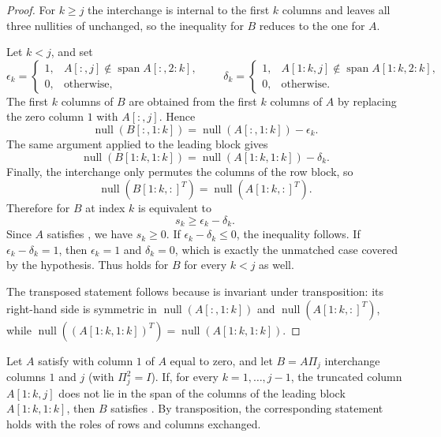 \documentclass[10pt,twoside]{siamart1116}
\DeclareMathOperator{\nl}{null}
\numberwithin{theorem}{section}
\begin{document}
\begin{proof}
  For $k \ge j$ the interchange is internal to the first $k$ columns and leaves all three nullities of  unchanged, so the inequality for $B$ reduces to the one for $A$.

  Let $k < j$, and set
  \[
    \epsilon_k =
    \begin{cases}
      1, & A[:,j] \notin \operatorname{span} A[:,2:k],\\
      0, & \text{otherwise},
    \end{cases}
    \qquad
    \delta_k =
    \begin{cases}
      1, & A[1:k,j] \notin \operatorname{span} A[1:k,2:k],\\
      0, & \text{otherwise}.
    \end{cases}
  \]
  The first $k$ columns of $B$ are obtained from the first $k$ columns of $A$ by replacing the zero column $1$ with $A[:,j]$. Hence
  \[
    \nl(B[:,1:k]) = \nl(A[:,1:k]) - \epsilon_k.
  \]
  The same argument applied to the leading block gives
  \[
    \nl(B[1:k,1:k]) = \nl(A[1:k,1:k]) - \delta_k.
  \]
  Finally, the interchange only permutes the columns of the row block, so
  \[
    \nl({B[1:k,:]}^T) = \nl({A[1:k,:]}^T).
  \]
  Therefore  for $B$ at index $k$ is equivalent to
  \[
    s_k \ge \epsilon_k - \delta_k.
  \]
  Since $A$ satisfies , we have $s_k \ge 0$. If $\epsilon_k - \delta_k \le 0$, the inequality follows. If $\epsilon_k - \delta_k = 1$, then $\epsilon_k = 1$ and $\delta_k = 0$, which is exactly the unmatched case covered by the hypothesis. Thus  holds for $B$ for every $k < j$ as well.

  The transposed statement follows because  is invariant under transposition: its right-hand side is symmetric in $\nl(A[:,1:k])$ and $\nl({A[1:k,:]}^T)$, while $\nl((A[1:k,1:k])^T) = \nl(A[1:k,1:k])$.
\end{proof}

\begin{corollary}\label{lem:zero-line-indep}
  Let $A$ satisfy  with column $1$ of $A$ equal to zero, and let $B = A\Pi_j$ interchange columns $1$ and $j$ (with $\Pi_j^2 = I$). If, for every $k = 1, \ldots, j-1$, the truncated column $A[1:k,j]$ does not lie in the span of the columns of the leading block $A[1:k,1:k]$, then $B$ satisfies . By transposition, the corresponding statement holds with the roles of rows and columns exchanged.
\end{corollary}
\end{document}
